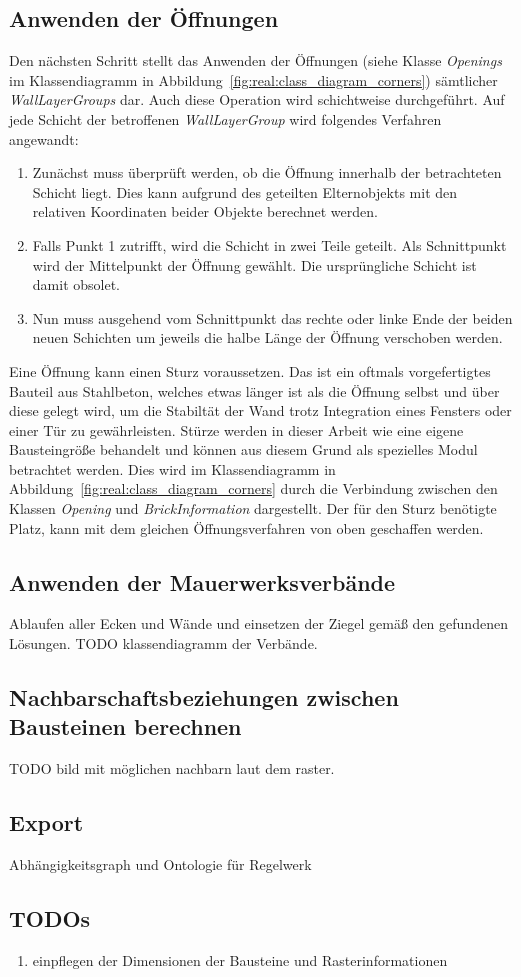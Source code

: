 \subsection{Anwenden der Öffnungen}
Den nächsten Schritt stellt das Anwenden der Öffnungen (siehe Klasse \textit{Openings} im Klassendiagramm in Abbildung~\ref{fig:real:class_diagram_corners}) sämtlicher \textit{WallLayerGroups} dar.
Auch diese Operation wird schichtweise durchgeführt.
Auf jede Schicht der betroffenen \textit{WallLayerGroup} wird folgendes Verfahren angewandt:
\begin{enumerate}
  \item Zunächst muss überprüft werden, ob die Öffnung innerhalb der betrachteten Schicht liegt. Dies kann aufgrund des geteilten Elternobjekts mit den relativen Koordinaten beider Objekte berechnet werden. 
  \item Falls Punkt 1 zutrifft, wird die Schicht in zwei Teile geteilt. Als Schnittpunkt wird der Mittelpunkt der Öffnung gewählt. Die ursprüngliche Schicht ist damit obsolet.
  \item Nun muss ausgehend vom Schnittpunkt das rechte oder linke Ende der beiden neuen Schichten um jeweils die halbe Länge der Öffnung verschoben werden.
\end{enumerate}
Eine Öffnung kann einen Sturz voraussetzen.
Das ist ein oftmals vorgefertigtes Bauteil aus Stahlbeton, welches etwas länger ist als die Öffnung selbst und über diese gelegt wird, um die Stabiltät der Wand trotz Integration eines Fensters oder einer Tür zu gewährleisten.
Stürze werden in dieser Arbeit wie eine eigene Bausteingröße behandelt und können aus diesem Grund als spezielles Modul betrachtet werden.
Dies wird im Klassendiagramm in Abbildung~\ref{fig:real:class_diagram_corners} durch die Verbindung zwischen den Klassen \textit{Opening} und \textit{BrickInformation} dargestellt.
Der für den Sturz benötigte Platz, kann mit dem gleichen Öffnungsverfahren von oben geschaffen werden.

\subsection{Anwenden der Mauerwerksverbände}
Ablaufen aller Ecken und Wände und einsetzen der Ziegel gemäß den gefundenen Lösungen.
TODO klassendiagramm der Verbände.

\subsection{Nachbarschaftsbeziehungen zwischen Bausteinen berechnen}
TODO bild mit möglichen nachbarn laut dem raster.

\subsection{Export}
Abhängigkeitsgraph und Ontologie für Regelwerk



\subsection*{TODOs}
\begin{enumerate}
  \item einpflegen der Dimensionen der Bausteine und Rasterinformationen
\end{enumerate}